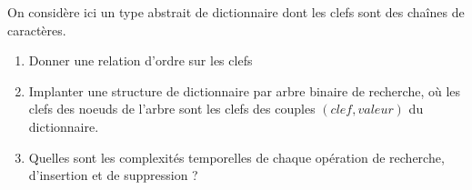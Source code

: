 \documentclass[../../../main.tex]{subfiles}
\begin{document}
On considère ici un type abstrait de dictionnaire dont les clefs sont des chaînes de caractères.
\begin{enumerate}
	\item Donner une relation d'ordre sur les clefs
	\item Implanter une structure de dictionnaire par arbre binaire de recherche, où les clefs des noeuds de l'arbre sont les clefs des couples $(clef, valeur)$ du dictionnaire.
	\item Quelles sont les complexités temporelles de chaque opération de recherche, d'insertion et de suppression ?
\end{enumerate}




\end{document}
